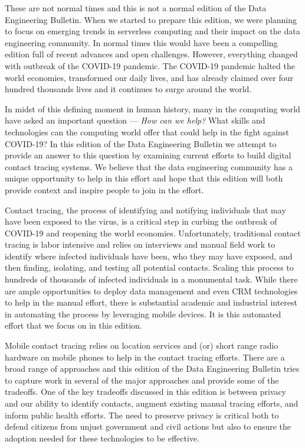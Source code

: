 \documentclass[11pt]{article}
\begin{document}
 
These are not normal times and this is not a normal edition of the Data Engineering Bulletin.  
When we started to prepare this edition, we were planning to focus on emerging trends in serverless computing and their impact on the data engineering community.  
In normal times this would have been a compelling edition full of recent advances and open challenges. 
However, everything changed with outbreak of the COVID-19 pandemic. 
The COVID-19 pandemic halted the world economies, transformed our daily lives, and has already claimed over four hundred thousands lives and it continues to surge around the world.


In midst of this defining moment in human history, many in the computing world have asked an important question ---
\emph{How can we help?}
What skills and technologies can the computing world offer that could help in the fight against COVID-19?
In this edition of the Data Engineering Bulletin we attempt to provide an answer to this question by examining current efforts to build digital contact tracing systems. 
We believe that the data engineering community has a unique opportunity to help in this effort and hope that this edition will both provide context and inspire people to join in the effort.


Contact tracing, the process of identifying and notifying individuals that may have been exposed to the virus, is a critical step in 
curbing the outbreak of COVID-19 and reopening the world economies.  
Unfortunately, traditional contact tracing is labor intensive and relies on interviews and manual field work to identify where infected individuals have been, who they may have exposed, and then finding, isolating, and testing all potential contacts.
Scaling this process to hundreds of thousands of infected individuals in a monumental task. 
While there are ample opportunities to deploy data management and even CRM technologies to help in the manual effort, there is substantial academic and industrial interest in automating the process by leveraging mobile devices.
It is this automated effort that we focus on in this edition.


Mobile contact tracing relies on location services and (or) short range radio hardware on mobile phones to help in the contact tracing efforts.  
There are a broad range of approaches and this edition of the Data Engineering Bulletin tries to capture work in several of the major approaches and provide some of the tradeoffs. 
One of the key tradeoffs discussed in this edition is between privacy and our ability to identify contacts, augment existing manual tracing efforts, and inform public health efforts.  
The need to preserve privacy is critical both to defend citizens from unjust government and civil actions but also to ensure the adoption needed for these technologies to be effective.
\end{document}
